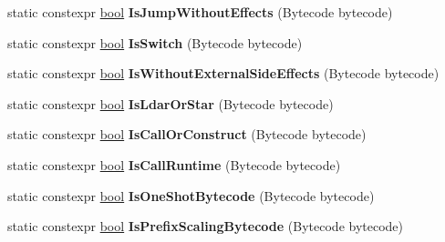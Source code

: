 \begin{DoxyCompactItemize}
static constexpr \mbox{\hyperlink{classbool}{bool}} {\bfseries Is\+Jump\+Without\+Effects} (Bytecode bytecode)
\item 
\mbox{\label{classv8_1_1internal_1_1interpreter_1_1Bytecodes_a5e7eef11a24a83e0cce90e81aaa96ba9}} 
static constexpr \mbox{\hyperlink{classbool}{bool}} {\bfseries Is\+Switch} (Bytecode bytecode)
\item 
\mbox{\label{classv8_1_1internal_1_1interpreter_1_1Bytecodes_a49d4a6cc7eb7397bc1d4e8934ead0234}} 
static constexpr \mbox{\hyperlink{classbool}{bool}} {\bfseries Is\+Without\+External\+Side\+Effects} (Bytecode bytecode)
\item 
\mbox{\label{classv8_1_1internal_1_1interpreter_1_1Bytecodes_ad7312c2c0d5396f6c127b34cad91c58c}} 
static constexpr \mbox{\hyperlink{classbool}{bool}} {\bfseries Is\+Ldar\+Or\+Star} (Bytecode bytecode)
\item 
\mbox{\label{classv8_1_1internal_1_1interpreter_1_1Bytecodes_a85747c14f501885a7197088c3d47b5b3}} 
static constexpr \mbox{\hyperlink{classbool}{bool}} {\bfseries Is\+Call\+Or\+Construct} (Bytecode bytecode)
\item 
\mbox{\label{classv8_1_1internal_1_1interpreter_1_1Bytecodes_a4c33673d5481f183117c0967a5a8f6f1}} 
static constexpr \mbox{\hyperlink{classbool}{bool}} {\bfseries Is\+Call\+Runtime} (Bytecode bytecode)
\item 
\mbox{\label{classv8_1_1internal_1_1interpreter_1_1Bytecodes_a86cd48ece189d592b2849eba1aebd30b}} 
static constexpr \mbox{\hyperlink{classbool}{bool}} {\bfseries Is\+One\+Shot\+Bytecode} (Bytecode bytecode)
\item 
\mbox{\label{classv8_1_1internal_1_1interpreter_1_1Bytecodes_aafd1e97e4412cf5567331551953ee196}} 
static constexpr \mbox{\hyperlink{classbool}{bool}} {\bfseries Is\+Prefix\+Scaling\+Bytecode} (Bytecode bytecode)
\item 
\mbox{\label{classv8_1_1internal_1_1interpreter_1_1Bytecodes_a0e86aaf1121b3e1f75f601c112c484c3}} 

\end{DoxyCompactItemize}
